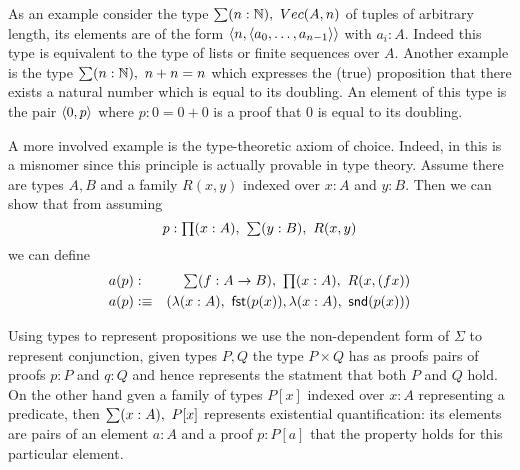 

As an example consider the type $\sm{n:\Nat}\Vect(A,n)$ of tuples of
arbitrary length, its elements are of the form
$\langle n,\langle a_0,\dots,a_{n-1}\rangle\rangle$ with $a_i : A$. Indeed this type is
equivalent to the type of lists or finite sequences over $A$. Another example is the type
$\sm{n:\Nat}n+n = n$ which expresses the (true) proposition that
there exists a natural number which is equal to its doubling. An
element of this type is the pair $\langle 0,p\rangle$ where $p: 0 = 0+0$ is a
proof that $0$ is equal to its doubling.

A more involved example is the type-theoretic axiom of choice. Indeed,
in this is a misnomer since this principle is actually provable in
type theory. Assume
there are types $A,B$ and a family $R(x,y)$ indexed over $x:A$ and
$y:B$. Then we can show that from assuming 
\[p : \prd{x:A}\sm{y :B}R(x,y)\] 
we can define 
\begin{eqnarray*}
a(p) & : & \sm{f : A \to B} \prd{x:A} R(x,(fx)) \\
a(p) & \defeq & (\lam{x:A} \fst(p(x)),\lam{x:A} \snd(p(x)))
\end{eqnarray*}

Using types to represent propositions we use the non-dependent
form of $\Sigma$ to represent conjunction, given types $P,Q$ the type
$P \times Q$ has as proofs pairs of proofs $p:P$ and $q:Q$ and hence
represents the statment that both $P$ and $Q$ hold. On the other hand
gven a family of types $P[x]$ indexed over $x:A$ representing a
predicate, then $\sm{x:A} P[x]$ represents existential quantification:
its elements are pairs of an element $a : A$ and a proof $p : P[a]$
that the property holds for this particular element.

